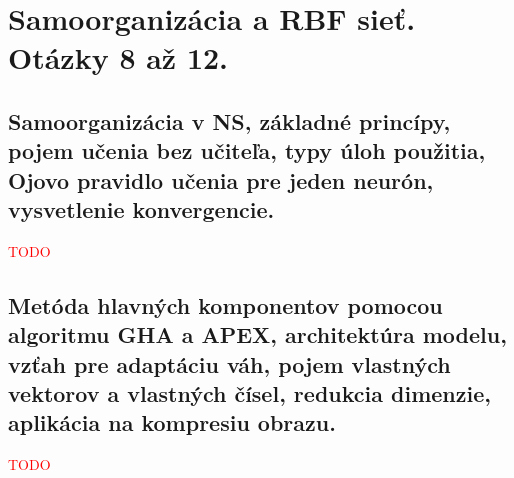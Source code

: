 \documentclass{article}
\numberwithin{equation}{section} %
\begin{document}
\section{Samoorganizácia a RBF sieť. Otázky 8 až 12.}
\subsection{Samoorganizácia v NS, základné princípy, pojem učenia bez učiteľa, typy úloh použitia, Ojovo pravidlo učenia pre jeden neurón, vysvetlenie konvergencie.}
\textcolor{red}{TODO}


\subsection{Metóda hlavných komponentov pomocou algoritmu GHA a APEX, architektúra modelu, vzťah pre adaptáciu váh, pojem vlastných vektorov a vlastných čísel, redukcia dimenzie, aplikácia na kompresiu obrazu.}
\textcolor{red}{TODO}
\end{document}
